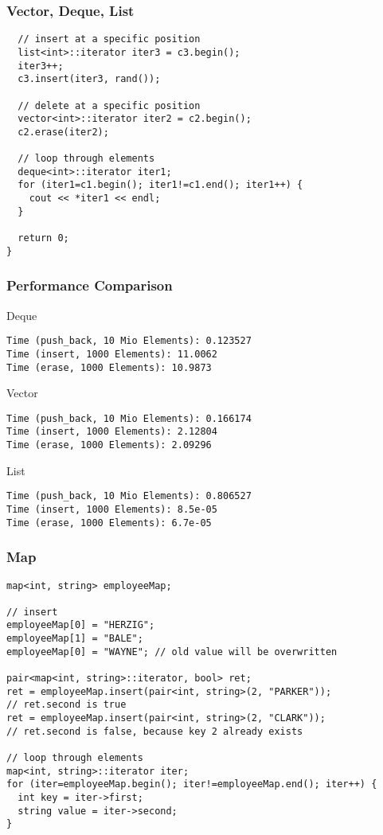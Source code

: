 \begin{frame}[fragile] 
\frametitle{Vector, Deque, List}
{\tiny
\begin{lstlisting}
  // insert at a specific position
  list<int>::iterator iter3 = c3.begin();
  iter3++;
  c3.insert(iter3, rand());
  
  // delete at a specific position
  vector<int>::iterator iter2 = c2.begin();
  c2.erase(iter2);
  
  // loop through elements
  deque<int>::iterator iter1;
  for (iter1=c1.begin(); iter1!=c1.end(); iter1++) {
    cout << *iter1 << endl;
  }
  
  return 0;
}
\end{lstlisting}
}
\end{frame}

\begin{frame}[fragile] 
  \frametitle{Performance Comparison}
  {\tiny
  Deque
  \begin{verbatim}
Time (push_back, 10 Mio Elements): 0.123527
Time (insert, 1000 Elements): 11.0062
Time (erase, 1000 Elements): 10.9873
  \end{verbatim}
  Vector
  \begin{verbatim}
Time (push_back, 10 Mio Elements): 0.166174
Time (insert, 1000 Elements): 2.12804
Time (erase, 1000 Elements): 2.09296
  \end{verbatim}
  List
  \begin{verbatim}
Time (push_back, 10 Mio Elements): 0.806527
Time (insert, 1000 Elements): 8.5e-05
Time (erase, 1000 Elements): 6.7e-05
  \end{verbatim}
  }
\end{frame}

\begin{frame}[fragile] 
\frametitle{Map}
{\tiny
\begin{lstlisting}
map<int, string> employeeMap;
  
// insert
employeeMap[0] = "HERZIG";
employeeMap[1] = "BALE";
employeeMap[0] = "WAYNE"; // old value will be overwritten
  
pair<map<int, string>::iterator, bool> ret;
ret = employeeMap.insert(pair<int, string>(2, "PARKER"));
// ret.second is true
ret = employeeMap.insert(pair<int, string>(2, "CLARK"));
// ret.second is false, because key 2 already exists
  
// loop through elements
map<int, string>::iterator iter;
for (iter=employeeMap.begin(); iter!=employeeMap.end(); iter++) {
  int key = iter->first;
  string value = iter->second;
}
\end{lstlisting}
}
\end{frame}

